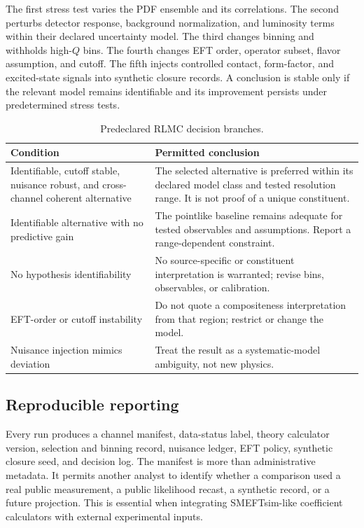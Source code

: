 The first stress test varies the PDF ensemble and its correlations. The second perturbs detector response, background normalization, and luminosity terms within their declared uncertainty model. The third changes binning and withholds high-$Q$ bins. The fourth changes EFT order, operator subset, flavor assumption, and cutoff. The fifth injects controlled contact, form-factor, and excited-state signals into synthetic closure records. A conclusion is stable only if the relevant model remains identifiable and its improvement persists under predetermined stress tests.

\begin{table}[!t]
\caption{Predeclared RLMC decision branches.}
\label{tab:branches}
\centering
\footnotesize
\begin{tabularx}{\columnwidth}{p{}Y}
\toprule
\textbf{Condition} & \textbf{Permitted conclusion}\\
\midrule
Identifiable, cutoff stable, nuisance robust, and cross-channel coherent alternative & The selected alternative is preferred within its declared model class and tested resolution range. It is not proof of a unique constituent.\\
Identifiable alternative with no predictive gain & The pointlike baseline remains adequate for tested observables and assumptions. Report a range-dependent constraint.\\
No hypothesis identifiability & No source-specific or constituent interpretation is warranted; revise bins, observables, or calibration.\\
EFT-order or cutoff instability & Do not quote a compositeness interpretation from that region; restrict or change the model.\\
Nuisance injection mimics deviation & Treat the result as a systematic-model ambiguity, not new physics.\\
\bottomrule
\end{tabularx}
\end{table}

\subsection{Reproducible reporting}

Every run produces a channel manifest, data-status label, theory calculator version, selection and binning record, nuisance ledger, EFT policy, synthetic closure seed, and decision log. The manifest is more than administrative metadata. It permits another analyst to identify whether a comparison used a real public measurement, a public likelihood recast, a synthetic record, or a future projection. This is essential when integrating SMEFTsim-like coefficient calculators \cite{brivio2017} with external experimental inputs.


